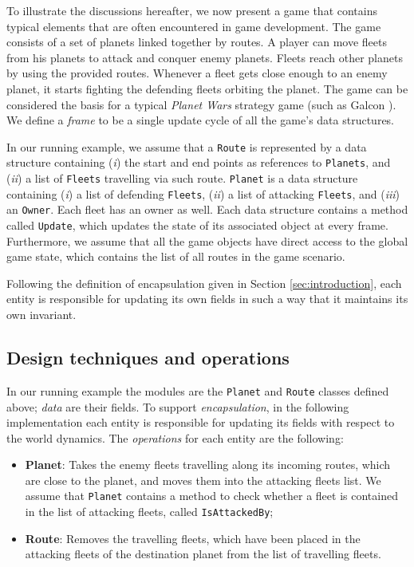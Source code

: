 
To illustrate the discussions hereafter, we now present a game that contains typical elements that are often encountered in game development. The game consists of a set of planets linked together by routes. A player can move fleets from his planets to attack and conquer enemy planets. Fleets reach other planets by using the provided routes. Whenever a fleet gets close enough to an enemy planet, it starts fighting the defending fleets orbiting the planet. The game can be considered the basis for a typical \emph{Planet Wars} strategy game (such as Galcon \cite{wiki:galcon}). We define a \textit{frame} to be a single update cycle of all the game's data structures.

In our running example, we assume that a \texttt{Route} is represented by a data structure containing (\textit{i}) the start and end points as references to \texttt{Planets}, and (\textit{ii}) a list of \texttt{Fleets} travelling via such route. \texttt{Planet} is a data structure containing (\textit{i}) a list of defending \texttt{Fleets}, (\textit{ii}) a list of attacking \texttt{Fleets}, and (\textit{iii}) an \texttt{Owner}. Each fleet has an owner as well. Each data structure contains a method called \texttt{Update}, which updates the state of its associated object at every frame. Furthermore, we assume that all the game objects have direct access to the global game state, which contains the list of all routes in the game scenario.

Following the definition of encapsulation given in Section \ref{sec:introduction}, each entity is responsible for updating its own fields in such a way that it maintains its own invariant.

\subsection{Design techniques and operations}

In our running example the modules are the \texttt{Planet} and \texttt{Route} classes defined above; \textit{data} are their fields. To support \emph{encapsulation}, in the following implementation each entity is responsible for updating its fields with respect to the world dynamics. The \textit{operations} for each entity are the following:
\begin{itemize}
    \item[] \textbf{Planet}: Takes the enemy fleets travelling along its incoming routes, which are close to the planet, and moves them into the attacking fleets list. We assume that \texttt{Planet} contains a method to check whether a fleet is contained in the list of attacking fleets, called \texttt{IsAttackedBy};
    \item[] \textbf{Route}: Removes the travelling fleets, which have been placed in the attacking fleets of the destination planet from the list of travelling fleets.
\end{itemize}

